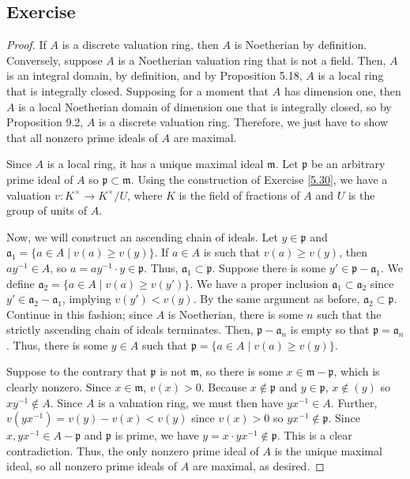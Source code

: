 \subsection{Exercise}\label{9.3}

\begin{proof}
If $A$ is a discrete valuation ring, then $A$ is Noetherian by definition. Conversely, suppose $A$ is a Noetherian valuation ring that is not a field. 
Then, $A$ is an integral domain, by definition, and by Proposition 5.18, $A$ is a local ring that is integrally closed. Supposing for a moment that $A$
has dimension one, then $A$ is a local Noetherian domain of dimension one that is integrally closed, so by Proposition 9.2, $A$ is a discrete valuation ring.
Therefore, we just have to show that all nonzero prime ideals of $A$ are maximal.

Since $A$ is a local ring, it has a unique maximal ideal $\mathfrak{m}$. Let $\mathfrak{p}$ be an arbitrary prime ideal of $A$ so $\mathfrak{p} \subset \mathfrak{m}$. 
Using the construction of Exercise \ref{5.30}, we have a valuation $v : K^{\times} \to K^{\times}/U$, where $K$ is the field of fractions of $A$ and $U$ is the group of 
units of $A$.

Now, we will construct an ascending chain of ideals. Let $y \in \mathfrak{p}$ and $\mathfrak{a}_1 = \{a \in A \mid v(a) \ge v(y)\}$.
If $a \in A$ is such that $v(a) \ge v(y)$, then $ay^{-1} \in A$, so $a = ay^{-1} \cdot y \in \mathfrak{p}$. Thus, $\mathfrak{a}_1 \subset \mathfrak{p}$. Suppose there
is some $y' \in \mathfrak{p} - \mathfrak{a}_1$. We define $\mathfrak{a}_2 = \{a \in A \mid v(a) \ge v(y')\}$. We have a proper inclusion $\mathfrak{a}_1 \subset \mathfrak{a}_2$ 
since $y' \in \mathfrak{a}_2 - \mathfrak{a}_1$, implying $v(y') < v(y)$. By the same argument as before, $\mathfrak{a}_2 \subset \mathfrak{p}$. Continue in this fashion; 
since $A$ is Noetherian, there is some $n$ such that the strictly ascending chain of ideals terminates. Then, $\mathfrak{p} - \mathfrak{a}_n$ is empty so that 
$\mathfrak{p} = \mathfrak{a}_n$. Thus, there is some $y \in A$ such that $\mathfrak{p} = \{a \in A \mid v(a) \ge v(y)\}$.

Suppose to the contrary that $\mathfrak{p}$ is not $\mathfrak{m}$, so there is some $x \in \mathfrak{m} - \mathfrak{p}$, which is clearly nonzero. Since $x \in \mathfrak{m}$, 
$v(x) > 0$. Because $x \not\in \mathfrak{p}$ and $y \in \mathfrak{p}$, $x \not\in (y)$ so $xy^{-1} \not\in A$. Since $A$ is a valuation ring, we must then have $yx^{-1} \in A$.
Further, $v(yx^{-1}) = v(y) - v(x) < v(y)$ since $v(x) > 0$ so $yx^{-1} \not\in \mathfrak{p}$. Since $x, yx^{-1} \in A-\mathfrak{p}$ and $\mathfrak{p}$ is prime, we have
$y = x \cdot yx^{-1} \not\in \mathfrak{p}$. This is a clear contradiction. Thus, the only nonzero prime ideal of $A$ is the unique maximal ideal, so all nonzero prime ideals
of $A$ are maximal, as desired.
\end{proof}

